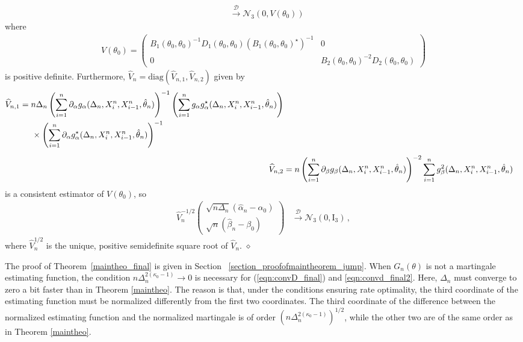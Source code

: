 \documentclass[11pt,a4paper]{article}
\newcommand{\xtl}{{X^n_{i-1}}}
\newcommand{\xtr}{X^n_i}
\newcommand{\thetan}{{\theta_0}}
\newcommand{\alphan}{{\alpha_0}}
\newcommand{\betan}{{\beta_0}}
\newcommand{\dd}{{\mathcal{D}}}
\newcommand{\nn}{{\mathcal{N}}}
\newcommand{\dqed}{{\leavevmode \unskip \penalty9999 \hbox{} \nobreak \hfill \quad \hbox{$\diamond$}}}
\numberwithin{equation}{section}
\numberwithin{theorem}{section}
\begin{document}
\begin{theorem}
\begin{align}
  &\overset{\dd}{\longrightarrow} \nn_3(0,V(\thetan))
\label{eqn:convD_final}
\end{align}
%
where
\begin{align*}
V(\thetan) = \begin{pmatrix}B_1(\thetan, \thetan)^{-1}D_1(\thetan, \thetan)(B_1(\thetan, \thetan)^\star )^{-1} & 0\\ 0 & B_2(\thetan, \thetan)^{-2}D_2(\thetan, \thetan)
\end{pmatrix}
\end{align*}
%
is positive definite. Furthermore, $\widehat{V}_n = \text{diag}( \widehat{V}_{n,1} , \widehat{V}_{n,2} )$ given by
\begin{align*}
\begin{split}
\widehat{V}_{n,1} &= n\Delta_n\left( \sum_{i=1}^n \partial_\alpha g_\alpha(\Delta_n,\xtr,\xtl,\hat{\theta}_n)\right)^{-1} \left( \sum_{i=1}^n g_\alpha g_\alpha^\star (\Delta_n,\xtr,\xtl, \hat{\theta}_n)\right)\\
&\hspace{5mm}\times\left( \sum_{i=1}^n \partial_\alpha g_\alpha^\star (\Delta_n,\xtr,\xtl,\hat{\theta}_n)\right)^{-1}
\end{split}\\[0.5em]
  \widehat{V}_{n,2} &= n\left( \sum_{i=1}^n \partial_\beta g_\beta(\Delta_n,\xtr,\xtl,\hat{\theta}_n)\right)^{-2} \sum_{i=1}^n g_\beta^2 (\Delta_n,\xtr,\xtl,\hat{\theta}_n)
\end{align*}
is a consistent estimator of $V(\thetan)$, so
\begin{align}
  \widehat{V}_n^{-1/2} \begin{pmatrix} \sqrt{n\Delta_n} (\hat{\alpha}_n - \alphan) \\  \sqrt{n}(\hat{\beta}_n-\betan) \end{pmatrix} &\overset{\dd}{\longrightarrow} \nn_3(0,\text{I}_3)\,,
                                                                                                                                      \label{eqn:convd_final2}
\end{align}
where $\widehat{V}_n^{1/2}$ is the unique, positive semidefinite square root of  $\widehat{V}_n$.\dqed
\label{maintheo_final}
\end{theorem}
%
The proof of Theorem~\ref{maintheo_final} is given in Section~ \ref{section_proofofmaintheorem_jump}. When $G_n(\theta)$ is not a martingale estimating function, the condition $n\Delta_n^{2({\kappa_0}-1)} \to 0$ is necessary for (\ref{eqn:convD_final}) and \eqref{eqn:convd_final2}. Here, $\Delta_n$ must converge to zero a bit faster than in Theorem \ref{maintheo}. The reason is that, under the conditions ensuring rate optimality, the third coordinate of the estimating function must be normalized differently from the first two coordinates. The third coordinate of the difference between the normalized estimating function and the normalized martingale is of order $( n\Delta_n^{2({\kappa_0}-1)})^{1/2}$, while the other two are of the same order as in Theorem \ref{maintheo}. \medskip
\end{document}
